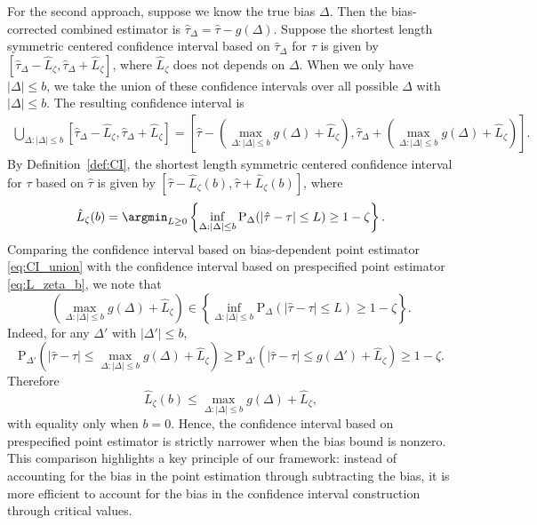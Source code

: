 \documentclass[11pt]{article}
\def\P{{\mathrm P}}
\newcommand{\htau}{\widehat\tau}
\numberwithin{equation}{section}
\theoremstyle{definition}
\begin{document}
For the second approach, suppose we know the true bias $\Delta$. Then the bias-corrected combined estimator is $\htau_{\Delta} = \htau - g(\Delta)$. Suppose the shortest length symmetric centered confidence interval based on $\htau_{\Delta}$ for $\tau$ is given by $[\htau_{\Delta} - \hat{L}_{\zeta}, \htau_{\Delta} + \hat{L}_{\zeta}]$, where $\hat{L}_{\zeta}$ does not depends on $\Delta$. When we only have $\lvert \Delta \rvert \le b$, we take the union of these confidence intervals over all possible $\Delta$ with $\lvert \Delta \rvert \le b$. The resulting confidence interval is
\begin{align}\label{eq:CI_union}
  \bigcup_{\Delta:\lvert \Delta \rvert \le b} [\htau_{\Delta} - \hat{L}_{\zeta}, \htau_{\Delta} + \hat{L}_{\zeta}] = \left[\htau - \left(\max_{\Delta:\lvert \Delta \rvert \le b} g(\Delta) + \hat{L}_{\zeta}\right), \htau_{\Delta} + \left(\max_{\Delta:\lvert \Delta \rvert \le b} g(\Delta) + \hat{L}_{\zeta}\right)\right].
\end{align}
By Definition~\ref{def:CI}, the shortest length symmetric centered confidence interval for $\tau$ based on $\htau$ is given by $[\htau- \hat{L}_{\zeta}(b), \htau + \hat{L}_{\zeta}(b)]$, where
\begin{align}\label{eq:L_zeta_b}
  \hat{L}_{\zeta}(b) = \argmin_{L \ge 0} \left\{ \inf_{\Delta: \lvert \Delta \rvert \le b} \P_\Delta(\lvert \hat\tau - \tau \rvert \le L) \ge 1 - \zeta \right\}.
\end{align}
Comparing the confidence interval based on bias-dependent point estimator \eqref{eq:CI_union} with the confidence interval based on prespecified point estimator \eqref{eq:L_zeta_b}, we note that
\[
  \left(\max_{\Delta:\lvert \Delta \rvert \le b} g(\Delta) + \hat{L}_{\zeta}\right) \in \left\{ \inf_{\Delta: \lvert \Delta \rvert \le b} \P_\Delta(\lvert \hat\tau - \tau \rvert \le L) \ge 1 - \zeta \right\}.
\]
Indeed, for any $\Delta'$ with $\lvert \Delta' \rvert \le b$,
\[
  \P_{\Delta'}\left(\lvert \hat\tau - \tau \rvert \le \max_{\Delta:\lvert \Delta \rvert \le b} g(\Delta) + \hat{L}_{\zeta}\right) \ge  \P_{\Delta'}\left(\lvert \hat\tau - \tau \rvert \le g(\Delta') + \hat{L}_{\zeta} \right) \ge 1 - \zeta.
\]
Therefore
\[
  \hat{L}_{\zeta}(b) \le \max_{\Delta:\lvert \Delta \rvert \le b} g(\Delta) + \hat{L}_{\zeta},
\]
with equality only when $b=0$. Hence, the confidence interval based on prespecified point estimator is strictly narrower when the bias bound is nonzero. This comparison highlights a key principle of our framework: instead of accounting for the bias in the point estimation through subtracting the bias, it is more efficient to account for the bias in the confidence interval construction through critical values.
\end{document}
